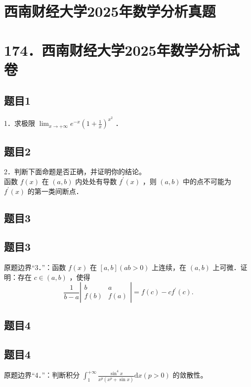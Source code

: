 \documentclass{article}
\begin{document}
\section*{西南财经大学2025年数学分析真题}
\section*{174．西南财经大学2025年数学分析试卷}

\subsection{题目1}
1．求极限 \(\lim _{x \rightarrow+\infty} e^{-x}\left(1+\frac{1}{x}\right)^{x^{2}}\) ．

\subsection{题目2}
2．判断下面命题是否正确，并证明你的结论。\\
函数 \(f(x)\) 在 \((a, b)\) 内处处有导数 \(f^{\prime}(x)\) ，则 \((a, b)\) 中的点不可能为 \(f^{\prime}(x)\) 的第一类间断点．

\begin{itemize}

\subsection{题目3}
\end{itemize}

\subsection{题目3}
原题边界“3．”：函数 \(f(x)\) 在 \([a, b](a b>0)\) 上连续，在 \((a, b)\) 上可微．证明：存在 \(c \in(a, b)\) ，使得
\[
\frac{1}{b-a}\left|\begin{array}{cc}
b & a \\
f(b) & f(a)
\end{array}\right|=f(c)-c f^{\prime}(c) .
\]

\subsection{题目4}

\subsection{题目4}
原题边界“4．”：判断积分 \(\int_{1}^{+\infty} \frac{\sin ^{4} x}{x^{p}\left(x^{p}+\sin x\right)} \mathrm{d} x(p>0)\) 的敛散性。
\end{document}
